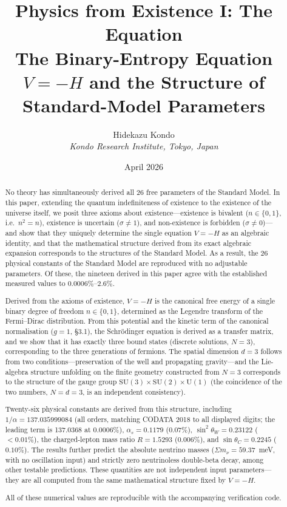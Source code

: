 \documentclass[12pt,a4paper]{article}
\title{\textbf{Physics from Existence I: The Equation}\\[0.45em]{\large The Binary-Entropy Equation $V = -H$ and the Structure of Standard-Model Parameters}}
\author{Hidekazu Kondo\\ \textit{Kondo Research Institute, Tokyo, Japan}}
\date{April 2026}
\begin{document}
\maketitle

\begin{abstract}\sloppy
No theory has simultaneously derived all 26 free parameters
of the Standard Model.
In this paper, extending the quantum indefiniteness of existence to the existence of the universe itself, we posit three axioms about existence---existence is bivalent ($n \in \{0,1\}$, i.e.\ $n^2{=}n$), existence is uncertain ($\sigma{\neq}1$), and non-existence is forbidden ($\sigma{\neq}0$)---and show that they uniquely determine the single equation $V = -H$ as an algebraic identity, and that the mathematical structure derived from its exact algebraic expansion corresponds to the structures of the Standard Model. As a result, the 26 physical constants of the Standard Model are reproduced with no adjustable parameters. Of these, the nineteen derived in this paper agree with the established measured values to $0.0006\%$--$2.6\%$.

Derived from the axioms of existence, $V = -H$ is the canonical free
energy of a single binary degree of freedom $n \in \{0,1\}$,
determined as the Legendre transform of the Fermi--Dirac
distribution. From this potential and the kinetic term of the
canonical normalisation ($g=1$, \S3.1), the Schr\"odinger equation is
derived as a transfer matrix, and we show that it has exactly three
bound states (discrete solutions, $N = 3$), corresponding to the three
generations of fermions. The spatial dimension $d = 3$ follows from
two conditions---preservation of the well and propagating
gravity---and the Lie-algebra structure unfolding on the finite
geometry constructed from $N = 3$ corresponds to the structure of the gauge group
$\mathrm{SU}(3){\times}\mathrm{SU}(2){\times}\mathrm{U}(1)$ (the coincidence of the two numbers, $N = d = 3$, is an independent consistency).

Twenty-six physical constants are derived from this
structure, including
$1/\alpha = 137.035999084$ (all orders, matching CODATA 2018 to all displayed digits; the leading term is 137.0368 at $0.0006\%$),
$\alpha_s = 0.1179$ ($0.07\%$),
$\sin^2\!\theta_W = 0.23122$ ($<0.01\%$),
the charged-lepton mass ratio $R = 1.5293$ ($0.006\%$), and
$\sin\theta_C = 0.2245$ ($0.10\%$).
The results further predict the absolute neutrino masses ($\Sigma m_\nu = 59.37$~meV, with no oscillation input) and strictly zero neutrinoless double-beta decay, among other testable predictions.
These quantities are not independent input
parameters---they are all computed from the same
mathematical structure fixed by $V = -H$.

All of these numerical values are reproducible with the accompanying
verification code.
\end{abstract}
\end{document}
